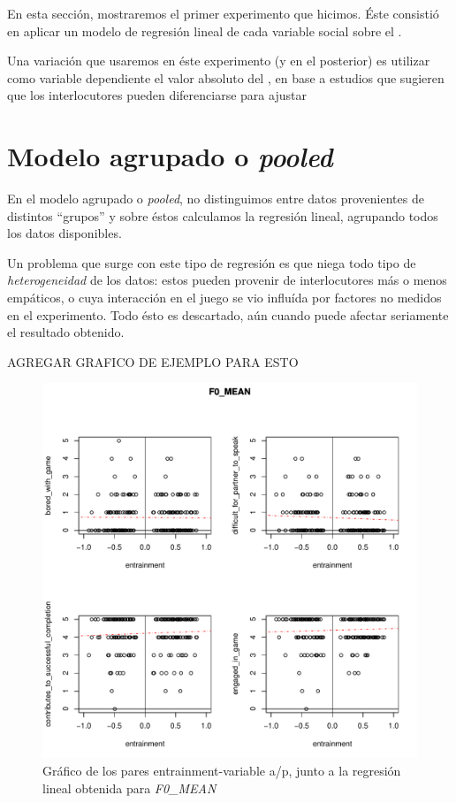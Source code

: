 En esta sección, mostraremos el primer experimento que hicimos. Éste consistió en aplicar un modelo de regresión lineal de cada variable social sobre el \entrainment.

Una variación que usaremos en éste experimento (y en el posterior) es utilizar como variable dependiente el valor absoluto del \entrainment, en base a estudios que sugieren que los interlocutores pueden diferenciarse para ajustar

\section{Modelo agrupado o \emph{pooled}}

En el modelo agrupado o \emph{pooled}, no distinguimos entre datos provenientes de distintos ``grupos'' \cite{gujarati1999} y sobre éstos calculamos la regresión lineal, agrupando todos los datos disponibles.

Un problema que surge con este tipo de regresión es que niega todo tipo de \emph{heterogeneidad} de los datos: estos pueden provenir de interlocutores más o menos empáticos, o cuya interacción en el juego se vio influída por factores no medidos en el experimento. Todo ésto es descartado, aún cuando puede afectar seriamente  el resultado obtenido.

AGREGAR GRAFICO DE EJEMPLO PARA ESTO

\begin{figure}[b!]
\includegraphics[width=15cm]{images/regression_F0_MEAN_1.pdf}
\caption{Gráfico de los pares entrainment-variable a/p, junto a la regresión lineal obtenida \label{regresion_clasica} para \emph{F0\_MEAN}}
\end{figure}

